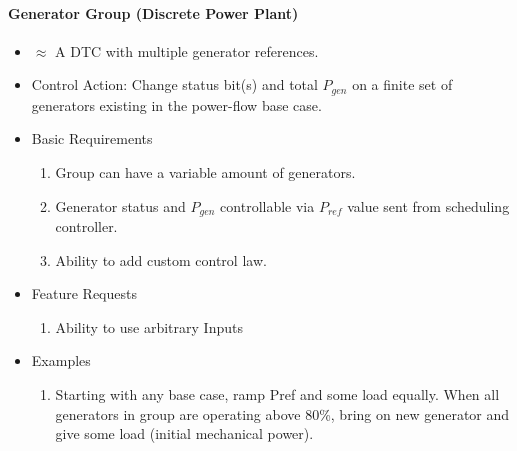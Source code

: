 \documentclass[12pt]{article}
\begin{document}
\begin{multicols*}{2}
\paragraph{Generator Group (Discrete Power Plant)}
\begin{itemize}
	\item $\approx$ A DTC with multiple generator references.
	\item Control Action: Change status bit(s) and total $P_{gen}$ on a finite set of generators existing in the power-flow base case. 
	\item Basic Requirements
	\begin{enumerate}
		\item Group can have a variable amount of generators.
		\item Generator status and $P_{gen}$ controllable via $P_{ref}$ value sent from scheduling controller.
		\item Ability to add custom control law.
	\end{enumerate}
	\item Feature Requests
	\begin{enumerate}
		\item Ability to use arbitrary Inputs
	\end{enumerate}
	\item Examples
	\begin{enumerate}
	\item Starting with any base case, ramp Pref and some load equally. When all generators in group are operating above 80\%, bring on new generator and give some load (initial mechanical power).
	\end{enumerate}	
\end{itemize}
\vfill\null
\end{multicols*}
\pagebreak
\end{document}
